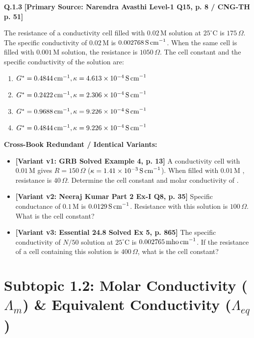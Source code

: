 \begin{problembox}
\textbf{Q.1.3} \hfill \textbf{[Primary Source: Narendra Avasthi Level-1 Q15, p. 8 / CNG-TH p. 51]}
\label{q:qb-c1-03}

The resistance of a conductivity cell filled with $0.02\,\text{M}$  solution at $25^\circ\text{C}$ is $175\,\Omega$. The specific conductivity of $0.02\,\text{M}$  is $0.002768\,\text{S\,cm}^{-1}$. When the same cell is filled with $0.001\,\text{M}$  solution, the resistance is $1050\,\Omega$. The cell constant and the specific conductivity of the  solution are:
\begin{enumerate}[label=(\alph*)]
    \item $G^* = 0.4844\,\text{cm}^{-1}, \kappa = 4.613 \times 10^{-4}\,\text{S\,cm}^{-1}$
    \item $G^* = 0.2422\,\text{cm}^{-1}, \kappa = 2.306 \times 10^{-4}\,\text{S\,cm}^{-1}$
    \item $G^* = 0.9688\,\text{cm}^{-1}, \kappa = 9.226 \times 10^{-4}\,\text{S\,cm}^{-1}$
    \item $G^* = 0.4844\,\text{cm}^{-1}, \kappa = 9.226 \times 10^{-4}\,\text{S\,cm}^{-1}$
\end{enumerate}

\tcbline
\textbf{\color{accentamber}Cross-Book Redundant / Identical Variants:}
\begin{itemize}[leftmargin=*,itemsep=2pt]
    \item \textbf{[Variant v1: GRB Solved Example 4, p. 13]} A conductivity cell with $0.01\,\text{M}$  gives $R = 150\,\Omega$ ($\kappa = 1.41 \times 10^{-3}\,\text{S\,cm}^{-1}$). When filled with $0.01\,\text{M}$ , resistance is $40\,\Omega$. Determine the cell constant and molar conductivity of .
    \item \textbf{[Variant v2: Neeraj Kumar Part 2 Ex-I Q8, p. 35]} Specific conductance of $0.1\,\text{M}$  is $0.0129\,\text{S\,cm}^{-1}$. Resistance with this solution is $100\,\Omega$. What is the cell constant?
    \item \textbf{[Variant v3: Essential  24.8 Solved Ex 5, p. 865]} The specific conductivity of $N/50$  solution at $25^\circ\text{C}$ is $0.002765\,\text{mho\,cm}^{-1}$. If the resistance of a cell containing this solution is $400\,\Omega$, what is the cell constant?
\end{itemize}
\end{problembox}

\section{Subtopic 1.2: Molar Conductivity ($\Lambda_m$) \& Equivalent Conductivity ($\Lambda_{eq}$)}

